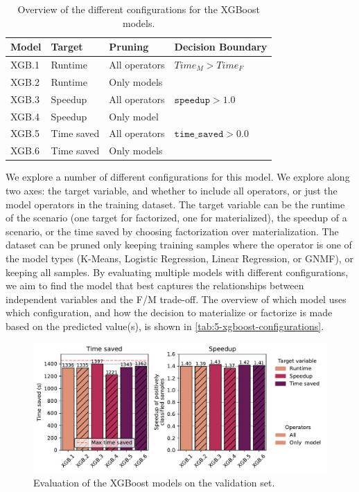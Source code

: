 \begin{table}[ht]
    \centering
    \begin{tabular}{llll}
        \toprule
        Model & Target     & Pruning       & Decision Boundary            \\
        \midrule \midrule
        XGB.1 & Runtime    & All operators & $Time_M > Time_F$            \\
        XGB.2 & Runtime    & Only models   &                              \\
        XGB.3 & Speedup    & All operators & $\texttt{speedup} > 1.0$     \\
        XGB.4 & Speedup    & Only model    &                              \\
        XGB.5 & Time saved & All operators & $\texttt{time\_saved} > 0.0$ \\
        XGB.6 & Time saved & Only models   &                              \\
        \bottomrule
    \end{tabular}
    \caption[XGBoost configurations]{Overview of the different configurations for the XGBoost models.}
    \label{tab:5-xgboost-configurations}
\end{table}

We explore a number of different configurations for this model. We explore along two axes: the target variable, and whether to include all operators, or just the model operators in the training dataset. The target variable can be the runtime of the scenario (one target for factorized, one for materialized), the speedup of a scenario, or the time saved by choosing factorization over materialization. The dataset can be pruned only keeping training samples where the operator is one of the model types (K-Means, Logistic Regression, Linear Regression, or GNMF), or keeping all samples. By evaluating multiple models with different configurations, we aim to find the model that best captures the relationships between independent variables and the F/M trade-off. The overview of which model uses which configuration, and how the decision to materialize or factorize is made based on the predicted value(s), is shown in \autoref{tab:5-xgboost-configurations}.

\begin{figure}[ht]
    \centering
    \includegraphics[width=\linewidth]{chapters/05_cost_estimation/figures/xgb-models-compare.pdf}
    \caption[XGBoost Estimator Comparison]{Evaluation of the XGBoost models on the validation set.}
    \label{fig:5-xgboost-evaluation}
\end{figure}

